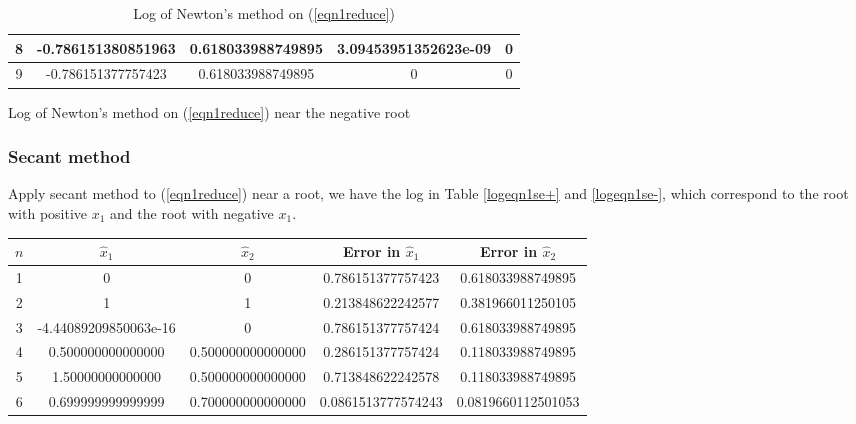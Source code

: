 \begin{table}[H]
\begin{table}[H]
\begin{table}[H]
\begin{table}[htbp]
\begin{subtable}[t]{\textwidth}
\begin{tabular}{|c|c|c|c|c|}
		8	&	\footnotesize	-0.786151380851963	&	\footnotesize	0.618033988749895	&	\footnotesize	3.09453951352623e-09	&	\footnotesize	0						\\	\hline
		9	&	\footnotesize	-0.786151377757423	&	\footnotesize	0.618033988749895	&	\footnotesize	0						&	\footnotesize	0						\\	\hline
		\end{tabular}
		\caption{Log of Newton's method on (\ref{eqn1reduce}) near the negative root}
		\label{logeqn1nt-}
	\end{subtable}
	\caption{Log of Newton's method on (\ref{eqn1reduce})}
	\label{logeqn1nt}
	\end{table}




\subsubsection{Secant method}
Apply secant method to (\ref{eqn1reduce}) near a root, we have the log in Table \ref{logeqn1se+} and \ref{logeqn1se-}, which correspond to the root with positive \(x_1\) and the root with negative \(x_1\).
\ifnum{}
	\begin{table}[H]
\else
	\begin{table}[htbp]
\fi
	\centering
	\begin{subtable}[t]{\textwidth}
		\centering
		\begin{tabular}{|c|c|c|c|c|}
		\hline
		\(n\)	&	\(\hat{x}_1\)	&	\(\hat{x}_2\)	&	Error in \(\hat{x}_1\)	&	Error in \(\hat{x}_2\)		\\	\hline
		1	&	\footnotesize	0						&	\footnotesize	0					&	\footnotesize	0.786151377757423		&	\footnotesize	0.618033988749895		\\	\hline
		2	&	\footnotesize	1						&	\footnotesize	1					&	\footnotesize	0.213848622242577		&	\footnotesize	0.381966011250105		\\	\hline
		3	&	\footnotesize	-4.44089209850063e-16	&	\footnotesize	0					&	\footnotesize	0.786151377757424		&	\footnotesize	0.618033988749895		\\	\hline
		4	&	\footnotesize	0.500000000000000		&	\footnotesize	0.500000000000000	&	\footnotesize	0.286151377757424		&	\footnotesize	0.118033988749895		\\	\hline
		5	&	\footnotesize	1.50000000000000		&	\footnotesize	0.500000000000000	&	\footnotesize	0.713848622242578		&	\footnotesize	0.118033988749895		\\	\hline
		6	&	\footnotesize	0.699999999999999		&	\footnotesize	0.700000000000000	&	\footnotesize	0.0861513777574243		&	\footnotesize	0.0819660112501053		\\	\hline

\end{tabular}
\end{subtable}
\end{table}
\end{table}
\end{table}
\end{table}
\end{table}
